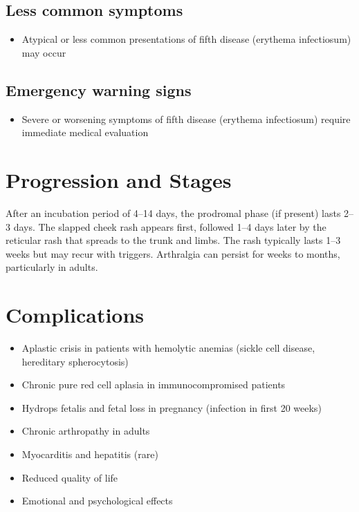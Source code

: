 \subsection{Less common symptoms}
\begin{itemize}[noitemsep]
  \item Atypical or less common presentations of fifth disease (erythema infectiosum) may occur
\end{itemize}

\subsection{Emergency warning signs}
\begin{itemize}[noitemsep]
  \item Severe or worsening symptoms of fifth disease (erythema infectiosum) require immediate medical evaluation
\end{itemize}
\section{Progression and Stages}
After an incubation period of 4--14 days, the prodromal phase (if present) lasts 2--3 days. The slapped cheek rash appears first, followed 1--4 days later by the reticular rash that spreads to the trunk and limbs. The rash typically lasts 1--3 weeks but may recur with triggers. Arthralgia can persist for weeks to months, particularly in adults.

\section{Complications}

\begin{itemize}[noitemsep]
  \item Aplastic crisis in patients with hemolytic anemias (sickle cell disease, hereditary spherocytosis)
  \item Chronic pure red cell aplasia in immunocompromised patients
  \item Hydrops fetalis and fetal loss in pregnancy (infection in first 20 weeks)
  \item Chronic arthropathy in adults
  \item Myocarditis and hepatitis (rare)
  \item Reduced quality of life
  \item Emotional and psychological effects
\end{itemize}

